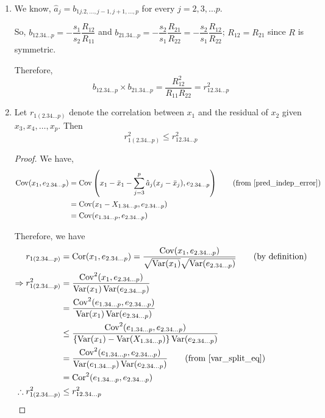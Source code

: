 \documentclass[10pt]{article}
\begin{document}
\begin{enumerate}[1.]
	\item We know, \( \hat{a}_j = b_{1j.2,\dots,j-1, j+1,\dots,p} \) for every \( j = 2, 3, \dots p \).

So, \( b_{12.34\dots p} = -\dfrac{s_1}{s_2}\dfrac{R_{12}}{R_{11}} \) and \( b_{21.34 \dots p} = -\dfrac{s_2}{s_1} \dfrac{R_{21}}{R_{22}} = -\dfrac{s_2}{s_1} \dfrac{R_{12}}{R_{22}} \); \( R_{12} = R_{21} \) since \( R \) is symmetric.

Therefore,
\[
	b_{12.34\dots p} \times b_{21.34\dots p} = \frac{R_{12}^{2}}{R_{11}R_{22}} = r_{12.34 \dots p}^{2}
\]
	\item Let \( r_{1(2.34\dots p)} \) denote the correlation between \( x_{1} \) and the residual of \( x_{2} \) given \( x_{3}, x_{4} , \dots, x_{p} \). Then
		\[ r_{1(2.34\dots p)}^{2} \leq r_{12.34\dots p}^{2} \]
\begin{proof}
	We have,
	\begin{align*}
		\Cov(x_{1}, e_{2.34\dots p}) &= \Cov \left( x_{1} - \bar{x}_{1} - \sum_{j=3}^{p}\hat{a}_{j} (x_{j} - \bar{x}_{j}), e_{2.34\dots p} \right) \tag*{(from \eqref{pred_indep_error})} \\
					     &= \Cov(x_{1} - X_{1.34\dots p}, e_{2.34\dots p}) \\
					     &= \Cov(e_{1.34\dots p}, e_{2.34\dots p})
	\end{align*}
	
	Therefore, we have
	\begin{align*}
		r_{1(2.34\dots p)} &= \operatorname{Cor}(x_{1}, e_{2.34\dots p}) = \frac{\Cov(x_{1}, e_{2.34\dots p})}{\sqrt{\Var(x_{1})}\sqrt{\Var(e_{2.34\dots p})}} \tag*{(by definition)} \\
		\implies r_{1(2.34\dots p)}^{2} &= \frac{\Cov^{2}(x_{1}, e_{2.34\dots p})}{\Var(x_1)\Var(e_{2.34\dots p})} \\
						&= \frac{\Cov^{2}(e_{1.34\dots p}, e_{2.34\dots p})}{\Var(x_1)\Var(e_{2.34\dots p})} \\
						& \leq \frac{\Cov^{2}(e_{1.34\dots p}, e_{2.34\dots p})}{\left\{ \Var(x_1) - \Var(X_{1.34\dots p}) \right\} \Var(e_{2.34\dots p})} \\
						&= \frac{\Cov^{2}(e_{1.34\dots p}, e_{2.34\dots p})}{\Var(e_{1.34\dots p})\Var(e_{2.34\dots p})} \tag*{(from \eqref{var_split_eq})} \\
						&= \operatorname{Cor}^{2} (e_{1.34\dots p}, e_{2.34\dots p}) \\
						\therefore r_{1(2.34\dots p)}^{2} &\leq r_{12.34\dots p}^{2}
	\end{align*}
	
\end{proof}
		
\end{enumerate}
\end{document}
